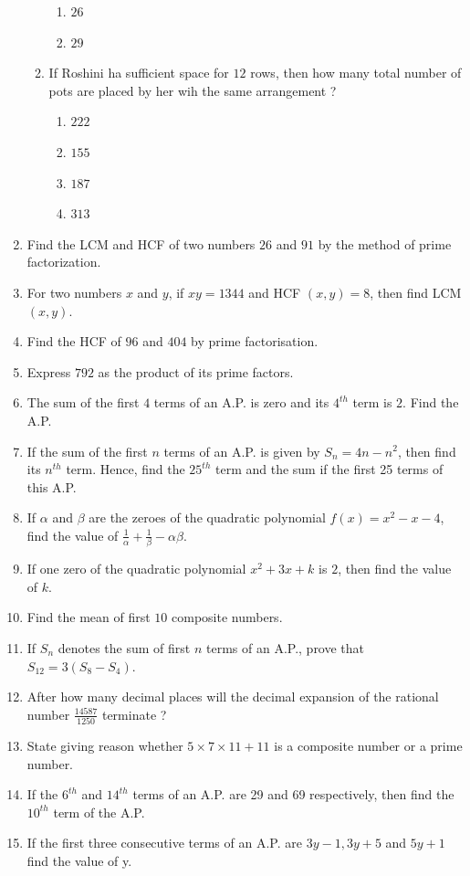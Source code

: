 \documentclass[10pt]{article}
\begin{document}
\begin{enumerate}
\begin{enumerate}[label=(\roman*)]
\begin{enumerate}[label=\Alph*]
					\item $26$
					\item $29$
				\end{enumerate}
			\item If Roshini ha sufficient space for $12$ rows, then how many total number of pots are placed by her wih the same arrangement ?
				\begin{enumerate}[label=\Alph*]
					\item $222$
					\item $155$
					\item $187$
					\item $313$
				\end{enumerate}
		\end{enumerate} 

	\item Find the LCM and HCF of two numbers $26$ and $91$ by the method of prime factorization.
	\item For two numbers $x$ and $y$, if $xy = 1344$ and HCF $(x,y) = 8$, then find LCM$(x, y)$.
	\item Find the HCF of $96$ and $404$ by prime factorisation.
	\item Express $792$ as the product of its prime factors.
	\item The sum of the first $4$ terms of an A.P. is zero and its $4^{th}$ term is $2$. Find the A.P.
	\item If the sum of the first $n$ terms of an A.P. is given by $S_n = 4n - n^2$, then find its $n^{th}$ term. Hence, find the $25^{th}$ term and the sum if the first 25 terms of this A.P.
	\item If $\alpha$ and $\beta$ are the zeroes of the quadratic polynomial $f(x) = x^{2} - x - 4$, find the value of $\frac{1}{\alpha} + \frac{1}{\beta} - {\alpha \beta}$.
	\item If one zero of the quadratic polynomial $x^{2} +  3x + k$ is $2$, then find the value of $k$.
	\item Find the mean of first $10$ composite numbers.
	\item If $S_n$ denotes the sum of first $n$ terms of an A.P., prove that $S_{12} = 3(S_8 - S_4)$.
	\item After how many decimal places will the decimal expansion of the rational number $\frac{14587}{1250}$ terminate ?			
	\item State giving reason whether $5\times 7\times 11 +11$ is a composite number or a prime number.
	\item If the $6^{th}$ and $14^{th}$ terms of an A.P. are 29 and 69 respectively, then find the $10^{th}$ term of the A.P.
	\item If the first three consecutive terms of an A.P. are $3y-1, 3y+5$ and $5y+1$ find the value of y. 
\end{enumerate}
\end{document}

